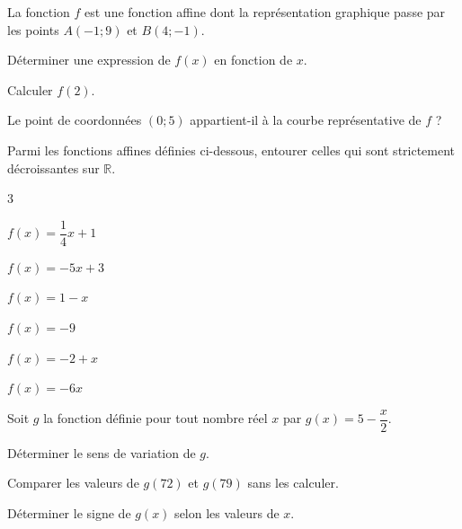 \documentclass[12pt,a4paper]{book}
\begin{document}
La fonction $f$ est une fonction affine dont la représentation graphique passe par les points $A(-1 ; 9)$ et $B(4 ;-1)$.
\begin{enumMet}
	\item Déterminer une expression de $f(x)$ en fonction de $x$.
	\item Calculer $f(2)$.

	\item Le point de coordonnées $(0 ; 5)$ appartient-il à la courbe représentative de $f$ ?

\end{enumMet}
\exerciceDS{}

Parmi les fonctions affines définies ci-dessous, entourer celles qui sont strictement décroissantes sur $\mathbb{R}$.
\begin{multicols}{3}
\begin{enumMet}
	\item $f(x)=\dfrac{1}{4} x+1$
	\item $f(x)=-5 x+3$
	\item $f(x)=1-x$
	\item $f(x)=-9$
	\item $f(x)=-2+x$
	\item $f(x)=-6 x$
\end{enumMet}
\end{multicols}

\exerciceDS{}

Soit $g$ la fonction définie pour tout nombre réel $x$ par $g(x)=5-\dfrac{x}{2}$.
\begin{enumMet}
	\item Déterminer le sens de variation de $g$. 
	\item Comparer les valeurs de $g(72)$ et $g(79)$ sans les calculer.
	\item Déterminer le signe de $g(x)$ selon les valeurs de $x$.
\end{enumMet}
\end{document}

